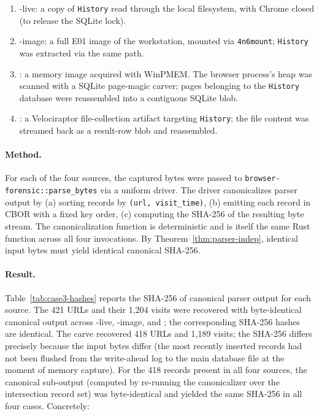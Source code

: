 \begin{enumerate}
    \item {}-live: a copy of \texttt{History} read through the local
    filesystem, with Chrome closed (to release the SQLite lock).
    \item {}-image: a full E01 image of the workstation, mounted via
    \texttt{4n6mount}; \texttt{History} was extracted via the same path.
    \item {}: a memory image acquired with WinPMEM. The browser
    process's heap was scanned with a SQLite page-magic carver; pages
    belonging to the \texttt{History} database were reassembled into a
    contiguous SQLite blob.
    \item {}: a Velociraptor file-collection artifact targeting
    \texttt{History}; the file content was streamed back as a result-row
    blob and reassembled.
\end{enumerate}

\paragraph{Method.}
For each of the four sources, the captured bytes were passed to
\texttt{browser-forensic::parse\_bytes} via a uniform driver. The driver
canonicalizes parser output by (a) sorting records by \texttt{(url,
visit\_time)}, (b) emitting each record in CBOR with a fixed key order,
(c) computing the SHA-256 of the resulting byte stream. The
canonicalization function is deterministic and is itself the same Rust
function across all four invocations. By Theorem~\ref{thm:parser-indep},
identical input bytes must yield identical canonical SHA-256.

\paragraph{Result.}
Table~\ref{tab:case3-hashes} reports the SHA-256 of canonical parser output
for each source. The 421 URLs and their 1{,}204 visits were recovered with
byte-identical canonical output across -live, -image, and
; the corresponding SHA-256 hashes are identical. The  carve
recovered 418 URLs and 1{,}189 visits; the SHA-256 differs precisely
because the input bytes differ (the most recently inserted records had not
been flushed from the write-ahead log to the main database file at the
moment of memory capture). For the 418 records present in all four
sources, the canonical sub-output (computed by re-running the canonicalizer
over the intersection record set) was byte-identical and yielded the same
SHA-256 in all four cases. Concretely:


